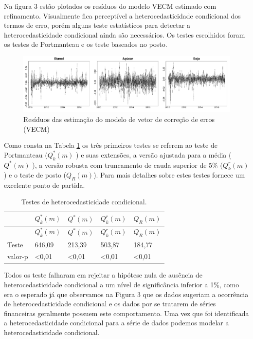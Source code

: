 Na figura 3 estão plotados os resíduos do modelo VECM estimado com
refinamento. Visualmente fica perceptível a heterocedasticidade
condicional dos termos de erro, porém alguns teste estatísticos para
detectar a heterocedasticidade condicional ainda são necessários. Os
testes escolhidos foram os testes de Portmanteau e os teste baseados no
posto. 

\begin{figure}[htbp]
	\centering
	\includegraphics{VECM resid-1.pdf}
	\caption{Resíduos das estimação do modelo de vetor de correção de erros
		(VECM)}
\end{figure}

Como consta na Tabela \ref{marcht} os três primeiros testes se referem ao
teste de Portmanteau (\(Q^*_k(m)\) ) e suas extensões, a versão
ajustada para a média (\(Q^*(m)\) ), a versão robusta com truncamento
de cauda superior de 5\% (\(Q^r_k(m)\)) e o teste de posto
(\(Q_R(m)\)). Para mais detalhes sobre estes testes  fornece
um excelente ponto de partida.



\begin{longtable}[]{@{}lllll@{}}
\caption{\label{marcht}Testes de heterocedasticidade condicional.}\tabularnewline
\toprule
& \(Q^*_k(m)\) & \(Q^*(m)\) & \(Q^r_k(m)\) & \(Q_R(m)\)\tabularnewline
\midrule
\endfirsthead
\toprule
& \(Q^*_k(m)\) & \(Q^*(m)\) & \(Q^r_k(m)\) & \(Q_R(m)\)\tabularnewline
\midrule
\endhead
Teste & 646,09 & 213,39 & 503,87 & 184,77\tabularnewline
valor-p & \textless{}0,01 & \textless{}0,01 & \textless{}0,01 &
\textless{}0,01\tabularnewline
\bottomrule
\end{longtable}

Todos os teste falharam em rejeitar a hipótese nula de ausência de
heterocedasticidade condicional a um nível de significância inferior a
1\%, como era o esperado já que observamos na Figura 3 que os dados
sugeriam a ocorrência de heterocedasticidade condicional e os dados por
se tratarem de séries financeiras geralmente possuem este comportamento. Uma vez
que foi identificada a heterocedasticidade condicional para a série de
dados podemos modelar a heterocedasticidade condicional.


